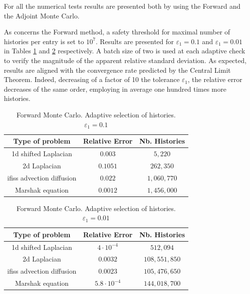 \documentclass[a4paper,10pt]{article}
\begin{document}
For all the numerical tests results are presented both by using the Forward 
and the Adjoint Monte Carlo. 

As concerns the Forward method, a safety threshold for maximal number of 
histories per 
entry is set to $10^7$. Results are presented for 
$\varepsilon_1=0.1$ and $\varepsilon_1=0.01$ in Tables \ref{tab:For_adapt} and 
\ref{tab:For_adapt2} respectively. A batch size of two is used at each 
adaptive check to verify the magnitude of the apparent relative standard 
deviation. As expected, results are aligned with the convergence rate predicted 
by the Central Limit Theorem. Indeed, decreasing of a factor of 10 the 
tolerance $\varepsilon_1$, the relative error decreases of the same order, 
employing in average one hundred times more histories.\newline


\begin{table}[!h]
\centering
\begin{tabular}{|c|c|c|}
\hline
\textbf{Type of problem} & \textbf{Relative Error} &\textbf{Nb. Histories}\\
\hline
1d shifted Laplacian & $0.003$ & $5,220$\\
\hline 
2d Laplacian & $0.1051$ & $262,350$\\
\hline
ifiss advection diffusion & $0.022$  & $1,060,770$\\
\hline
Marshak equation & $0.0012$ & $1,456,000$\\
\hline
\end{tabular}
\caption{Forward Monte Carlo. Adaptive selection of histories. 
$\varepsilon_1=0.1$} 
\label{tab:For_adapt}
\end{table}

\begin{table}[!h]
\centering
\begin{tabular}{|c|c|c|}
\hline
\textbf{Type of problem} & \textbf{Relative Error} &\textbf{Nb. Histories}\\
\hline
1d shifted Laplacian & $4\cdot 10^{-4}$ & $512,094$\\
\hline 
2d Laplacian & $0.0032$ & $108,551,850$\\
\hline
ifiss advection diffusion & $0.0023$  & $105,476,650$\\
\hline
Marshak equation & $5.8 \cdot 10^{-4}$ & $144,018,700$\\
\hline
\end{tabular}
\caption{Forward Monte Carlo. Adaptive selection of histories. 
$\varepsilon_1=0.01$} 
\label{tab:For_adapt2}
\end{table}
\end{document}
